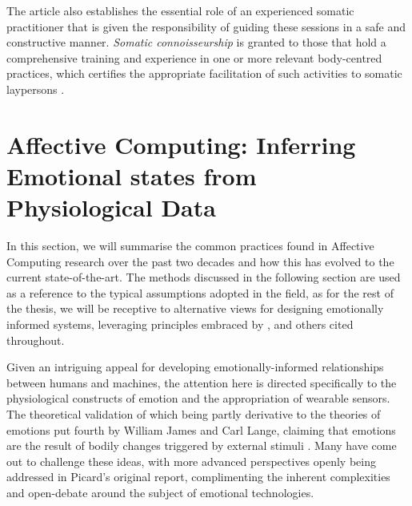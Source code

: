 The article also establishes the essential role of an experienced somatic practitioner that is given the responsibility of guiding these sessions in a safe and constructive manner. \textit{Somatic connoisseurship} is granted to those that hold a comprehensive training and experience in one or more relevant body-centred practices, which certifies the appropriate facilitation of such activities to somatic laypersons \cite{samaritter_aesthetic_2018}.

\section{Affective Computing: Inferring Emotional states from Physiological Data}%
\label{alit_review:affective_computing}

In this section, we will summarise the common practices found in Affective Computing research over the past two decades and how this has evolved to the current state-of-the-art. The methods discussed in the following section are used as a reference to the typical assumptions adopted in the field, as for the rest of the thesis, we will be receptive to alternative views for designing emotionally informed systems, leveraging principles embraced by \citeauthor{hook_interactional_2008} \cite{hook_interactional_2008}, \citeauthor{barrett_functionalism_2017} \cite{barrett_functionalism_2017} and others cited throughout.

Given an intriguing appeal for developing emotionally-informed relationships between humans and machines, the attention here is directed specifically to the physiological constructs of emotion and the appropriation of wearable sensors. The theoretical validation of which being partly derivative to the theories of emotions put fourth by William James and Carl Lange, claiming that emotions are the result of bodily changes triggered by external stimuli \cite{james_principles_1890,cannon_james-lange_1927}. Many have come out to challenge these ideas, with more advanced perspectives openly being addressed in Picard's original report, complimenting the inherent complexities and open-debate around the subject of emotional technologies.


